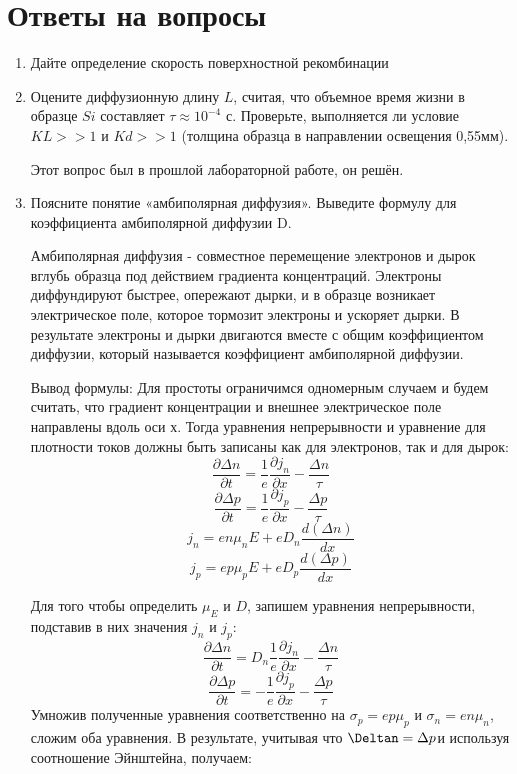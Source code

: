 \documentclass[a4paper, 12pt]{article}
\begin{document}
\section{Ответы на вопросы}
\begin{enumerate}
    \item Дайте определение скорость поверхностной рекомбинации
    \item Оцените диффузионную длину $L$, считая, что объемное время жизни в образце $Si$ составляет
 $\tau\approx 10^{-4}$ с. Проверьте, выполняется ли условие $KL>>1$ и $Kd>>1$ (толщина образца в направлении  освещения 0,55мм).\par
 Этот вопрос был в прошлой лабораторной работе, он решён.
    \item Поясните понятие «амбиполярная диффузия». Выведите формулу для коэффициента амбиполярной диффузии D.\par
    Амбиполярная диффузия - совместное перемещение электронов и дырок вглубь образца под действием градиента концентраций. Электроны диффундируют быстрее, опережают дырки, и в образце возникает электрическое поле, которое тормозит электроны и ускоряет дырки. В результате электроны и дырки двигаются вместе с общим коэффициентом диффузии, который называется коэффициент амбиполярной диффузии.\par
    Вывод формулы: Для простоты ограничимся одномерным случаем и будем считать, что градиент концентрации и внешнее электрическое поле направлены вдоль оси х. Тогда уравнения непрерывности и уравнение для плотности токов должны быть записаны как для электронов, так и для дырок:
    \[
    \frac{\partial\Delta n}{\partial t}= \frac{1}{e}\frac{\partial j_n}{\partial x} - \frac{\Delta n}{\tau}
    \]
    \[
    \frac{\partial\Delta p}{\partial t}= \frac{1}{e}\frac{\partial j_p}{\partial x} - \frac{\Delta p}{\tau}
    \]
    \[
    j_n = en\mu_n E + eD_n\frac{d(\Delta n)}{dx}
    \]
      \[
    j_p = ep\mu_p E + eD_p\frac{d(\Delta p)}{dx}
    \]
    \par
    Для того чтобы определить $\mu_E$ и $D$, запишем уравнения непрерывности, подставив в них значения $j_n$ и $j_p$:
    \[
    \frac{\partial\Delta n}{\partial t}= D_n\frac{1}{e}\frac{\partial j_n}{\partial x} - \frac{\Delta n}{\tau}
    \]
    \[
    \frac{\partial\Delta p}{\partial t}=- \frac{1}{e}\frac{\partial j_p}{\partial x} - \frac{\Delta p}{\tau}
    \]
    Умножив полученные уравнения соответственно на $\sigma_p = ep\mu_p$ и $\sigma_n = en\mu_n$, сложим оба уравнения. В результате, учитывая что $\Deltan =\Delta p$и используя соотношение Эйнштейна, получаем:

\end{enumerate}
\end{document}
